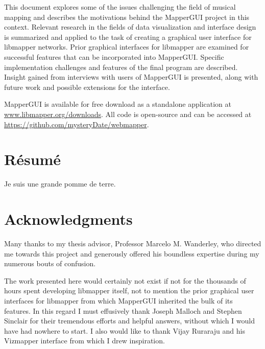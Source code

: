 \documentclass [12pt,letterpaper]{report}
\begin{document}
This document explores some of the issues challenging the field of musical mapping and describes the motivations behind the MapperGUI project in this context. Relevant research in the fields of data visualization and interface design is summarized and applied to the task of creating a graphical user interface for libmapper networks. Prior graphical interfaces for libmapper are examined for successful features that can be incorporated into MapperGUI. Specific implementation challenges and features of the final program are described. Insight gained from interviews with users of MapperGUI is presented, along with future work and possible extensions for the interface.

MapperGUI is available for free download as a standalone application at \url{www.libmapper.org/downloads}. All code is open-source and can be accessed at \url{https://github.com/mysteryDate/webmapper}.

\newpage

\section*{\centering R\'esum\'e}

Je suis une grande pomme de terre.

\pagebreak

\section*{\centering Acknowledgments}

Many thanks to my thesis advisor, Professor Marcelo M. Wanderley, who directed me towards this project and generously offered his boundless expertise during my numerous bouts of confusion.

The work presented here would certainly not exist if not for the thousands of hours spent developing libmapper itself, not to mention the prior graphical user interfaces for libmapper from which MapperGUI inherited the bulk of its features. In this regard I must effusively thank Joseph Malloch and Stephen Sinclair for their tremendous efforts and helpful answers, without which I would have had nowhere to start. I also would like to thank Vijay Ruraraju and his Vizmapper interface from which I drew inspiration.
\end{document}
